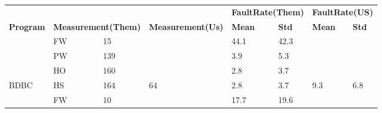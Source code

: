 \begin{figure*}[!t]
\centering
\begin{tabular}{|l|l|l|l|l|l|l|l|}
\hline
                                   & \multicolumn{2}{c|}{}                                             &                                            & \multicolumn{2}{l|}{\textbf{FaultRate(Them)}}               & \multicolumn{2}{l|}{\textbf{FaultRate(US)}}   \\ \cline{5-8} 
\multirow{-2}{*}{\textbf{Program}} & \multicolumn{2}{c|}{\multirow{-2}{*}{\textbf{Measurement(Them)}}} & \multirow{-2}{*}{\textbf{Measurement(Us)}} & \textbf{Mean}                & \textbf{Std}                 & \textbf{Mean}         & \textbf{Std}          \\ \hline
                                   & FW                              & 15                              &                                            & \cellcolor[HTML]{C0C0C0}44.1 & \cellcolor[HTML]{C0C0C0}42.3 &                       &                       \\ \cline{2-3} \cline{5-6}
                                   & PW                              & 139                             &                                            & 3.9                          & 5.3                          &                       &                       \\ \cline{2-3} \cline{5-6}
                                   & HO                              & 160                             &                                            & 2.8                          & 3.7                          &                       &                       \\ \cline{2-3} \cline{5-6}
\multirow{-4}{*}{BDBC}             & HS                              & 164                             & \multirow{-4}{*}{64}                       & 2.8                          & 3.7                          & \multirow{-4}{*}{9.3} & \multirow{-4}{*}{6.8} \\ \hline
                                   & FW                              & 10                              &                                            & \cellcolor[HTML]{C0C0C0}17.7 & \cellcolor[HTML]{C0C0C0}19.6 &                       &                       \\ \cline{2-3} \cline{5-6}

\end{tabular}
\end{figure*}
